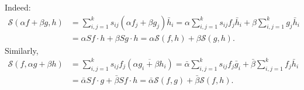 \documentclass[11pt, oneside, a4paper]{article}
\begin{document}
Indeed:
\begin{align*}
    \mathcal{S}(\alpha f+\beta g, h)
    &= \sum_{i,j=1}^k s_{ij}(\alpha f_j + \beta g_j)\bar{h}_i
    = \alpha \sum_{i,j=1}^k s_{ij}f_j\bar{h}_i + \beta \sum_{i,j=1}^k g_j\bar{h}_i\\
    &= \alpha Sf\cdot h + \beta Sg\cdot h
    = \alpha\mathcal{S}(f,h) + \beta\mathcal{S}(g,h).
\end{align*}
Similarly,
\begin{align*}
    \mathcal{S}(f, \alpha g + \beta h)
    &= \sum_{i,j=1}^k s_{ij}f_j(\overline{\alpha g_i + \beta h_i})
    = \bar{\alpha}\sum_{i,j=1}^k s_{ij}f_j\bar{g}_i + \bar{\beta}\sum_{i,j=1}^k f_j \bar{h}_i\\
    &= \bar{\alpha}Sf\cdot g + \bar{\beta}Sf\cdot h
    = \bar{\alpha}\mathcal{S}(f,g) + \bar{\beta}\mathcal{S}(f,h).
\end{align*}
\end{document}
